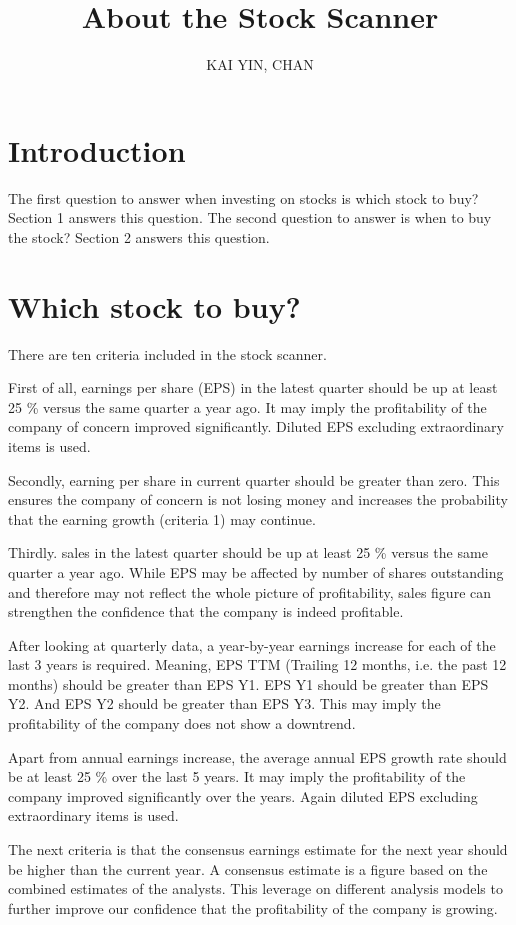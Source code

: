 \documentclass{article}
\begin{document}
\title{About the Stock Scanner}
\author{KAI YIN, CHAN}
\maketitle
\section{Introduction}
The first question to answer when investing on stocks is which stock to buy? Section 1 answers this question. The second question to answer is when to buy the stock? Section 2 answers this question.

\section{Which stock to buy?}
There are ten criteria included in the stock scanner.

First of all, earnings per share (EPS) in the latest quarter should be up at least 25 \% versus the same quarter a year ago. It may imply the profitability of the company of concern improved significantly. Diluted EPS excluding extraordinary items is used.

Secondly, earning per share in current quarter should be greater than zero. This ensures the company of concern is not losing money and increases the probability that the earning growth (criteria 1) may continue.

Thirdly. sales in the latest quarter should be up at least 25 \% versus the same quarter a year ago. While EPS may be affected by number of shares outstanding and therefore may not reflect the whole picture of profitability, sales figure can strengthen the confidence that the company is indeed profitable.

After looking at quarterly data, a year-by-year earnings increase for each of the last 3 years is required. Meaning, EPS TTM (Trailing 12 months, i.e. the past 12 months) should be greater than EPS Y1. EPS Y1 should be greater than EPS Y2. And EPS Y2 should be greater than EPS Y3. This may imply the profitability of the company does not show a downtrend.

Apart from annual earnings increase, the average annual EPS growth rate should be at least 25 \% over the last 5 years. It may imply the profitability of the company improved significantly over the years. Again diluted EPS excluding extraordinary items is used.

The next criteria is that the consensus earnings estimate for the next year should be higher than the current year. A consensus estimate is a figure based on the combined estimates of the analysts. This leverage on different analysis models to further improve our confidence that the profitability of the company is growing.
\end{document}
